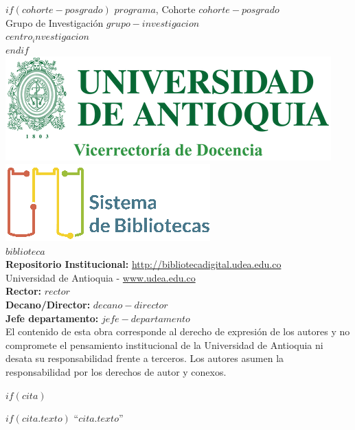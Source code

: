 \vspace{1cm}
$if(cohorte-posgrado)$
\noindent
{$programa$, Cohorte $cohorte-posgrado$}\\
{Grupo de Investigación $grupo-investigacion$}\\
{$centro_investigacion$}\\[1cm]
$endif$
%
\includegraphics{assets/escudo_udea_vice.png}\quad
\includegraphics{assets/sis_biblo.png}\\
{$biblioteca$}\\[1cm]
%
{\textbf{Repositorio Institucional:} \url{http://bibliotecadigital.udea.edu.co}}\\[1cm]
{Universidad de Antioquia - \url{www.udea.edu.co}}\\[0.5cm]
%
{\textbf{Rector:} $rector$}\\
{\textbf{Decano/Director:} $decano-director$}\\
{\textbf{Jefe departamento:} $jefe-departamento$}\\[1cm]
%
El contenido de esta obra corresponde al derecho de expresión de los autores y no compromete el pensamiento institucional de la Universidad de Antioquia ni desata su responsabilidad frente a terceros. Los autores asumen la responsabilidad por los derechos de autor y conexos.
\newpage


$if(cita)$

\thispagestyle{empty}

\vspace*{0.2\textheight}

$if(cita.texto)$
\noindent``{\itshape $cita.texto$}''\bigbreak

